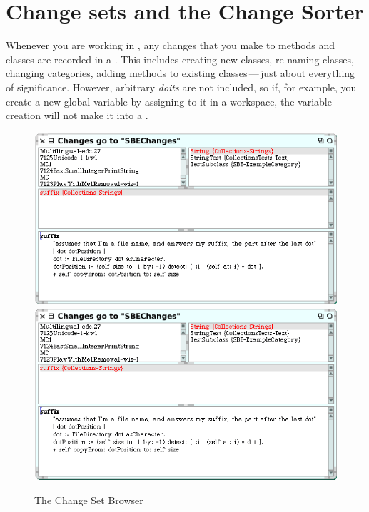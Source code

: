 \documentclass[a4paper,10pt,twoside]{book}
\begin{document}

\section{Change sets and the Change Sorter}
\label{sec:env:changeSet} %

Whenever you are working in \sq, any changes that you make to methods and classes are recorded in a .
This includes creating new classes, re-naming classes, changing categories, adding methods to existing classes\,---\,just about everything of significance.  
However, arbitrary \emph{doits} are not included, so if, for example, you create a new global variable by assigning to it in a workspace, the variable creation will not make it into a .

\begin{figure}[btp]
	\begin{center}
	\ifluluelse
		{\includegraphics [width=\textwidth]{changeSetBrowser}}
		{\includegraphics[scale=0.7]{changeSetBrowser}}
	\end{center}
	\caption{The Change Set Browser}
	\label{fig:changeSetBrowser}
\end{figure}
\end{document}
